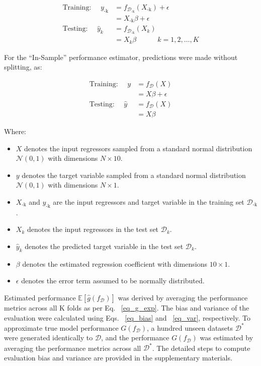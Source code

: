 \begin{equation} \label{eq_kfoldcv}
    \begin{split}
	\text{Training: } \quad y_{\text{-k}} &= f_{\mathcal{D}_{\text{-k}}}(X_{\text{-k}})+\epsilon \\
    &= X_{\text{-k}} \beta + \epsilon \\
    \text{Testing: } \quad \hat{y}_k &= f_{\mathcal{D}_{\text{-k}}}(X_k) \\
    &=X_k \beta \quad \quad \quad k=1,2,\ldots,K
    \end{split}
\end{equation}

For the “In-Sample” performance estimator, predictions were made without splitting, as:

\begin{equation} \label{eq_insample}
    \begin{split}
    	\text{Training: } \quad y &= f_\mathcal{D}(X) \\ &= X\beta + \epsilon \\
        \text{Testing: } \quad \hat{y} &= f_\mathcal{D}(X) \\ &=X \beta
    \end{split}
\end{equation}

Where:
\begin{itemize}
  \item \( X \) denotes the input regressors sampled from a standard normal distribution \( \mathcal{N}(0, 1) \) with dimensions \( N \times 10 \).
  \item \( y \) denotes the target variable sampled from a standard normal distribution \( \mathcal{N}(0, 1) \) with dimensions \( N \times 1 \).
  \item \( X_\text{-k} \) and \( y_\text{-k} \) are the input regressors and target variable in the training set \( \mathcal{D}_\text{-k} \).
  \item \( X_k \) denotes the input regressors in the test set \( \mathcal{D}_k \).
  \item \( \hat{y}_k \) denotes the predicted target variable in the test set \( \mathcal{D}_k \).
  \item \( \beta \) denotes the estimated regression coefficient with dimensions \( 10 \times 1 \).
  \item \( \epsilon \) denotes the error term assumed to be normally distributed.
\end{itemize}

Estimated performance $\mathbb{E}[\hat{g}(f_\mathcal{D})]$ was derived by averaging the performance metrics across all K folds as per Eq. ~\ref{eq_g_exp}. The bias and variance of the evaluation were calculated using Eqs. ~\ref{eq_bias} and ~\ref{eq_var}, respectively. To approximate true model performance $G(f_\mathcal{D})$, a hundred unseen datasets $\mathcal{D}^\ast$ were generated identically to $\mathcal{D}$, and the performance $G(f_\mathcal{D})$ was estimated by averaging the performance metrics across all $\mathcal{D}^\ast$. The detailed steps to compute evaluation bias and variance are provided in the supplementary materials.
